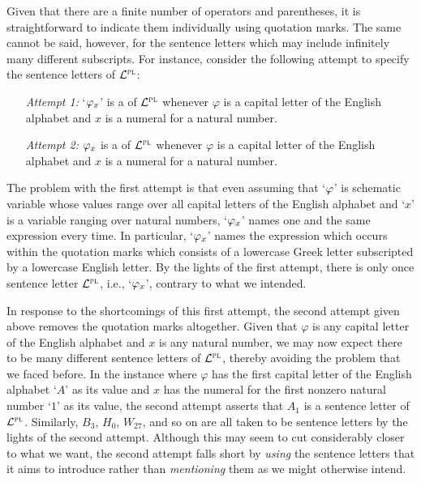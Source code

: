 Given that there are a finite number of operators and parentheses, it is straightforward to indicate them individually using quotation marks.
The same cannot be said, however, for the sentence letters which may include infinitely many different subscripts.
For instance, consider the following attempt to specify the sentence letters of $\mathcal{L}^{\textsc{pl}}$:

\begin{enumerate}[leftmargin=1.25in, itemsep=-.4em]
  \item[\it Attempt 1:] `$\varphi_x$' is a  of $\mathcal{L}^{\textsc{pl}}$ whenever $\varphi$ is a capital letter of the English alphabet and $x$ is a numeral for a natural number. 
  \item[\it Attempt 2:] $\varphi_x$ is a  of $\mathcal{L}^{\textsc{pl}}$ whenever $\varphi$ is a capital letter of the English alphabet and $x$ is a numeral for a natural number. 
\end{enumerate}

The problem with the first attempt is that even assuming that `$\varphi$' is schematic variable whose values range over all capital letters of the English alphabet and `$x$' is a variable ranging over natural numbers, `$\varphi_x$' names one and the same expression every time.
In particular, `$\varphi_x$' names the expression which occurs within the quotation marks which consists of a lowercase Greek letter subscripted by a lowercase English letter.
By the lights of the first attempt, there is only once sentence letter $\mathcal{L}^{\textsc{pl}}$, i.e., `$\varphi_x$', contrary to what we intended.

In response to the shortcomings of this first attempt, the second attempt given above removes the quotation marks altogether.
Given that $\varphi$ is any capital letter of the English alphabet and $x$ is any natural number, we may now expect there to be many different sentence letters of $\mathcal{L}^{\textsc{pl}}$, thereby avoiding the problem that we faced before.
In the instance where $\varphi$ has the first capital letter of the English alphabet `$A$' as its value and $x$ has the numeral for the first nonzero natural number `$1$' as its value, the second attempt asserts that $A_1$ is a sentence letter of $\mathcal{L}^{\textsc{pl}}$. 
Similarly, $B_3$, $H_0$, $W_{27}$, and so on are all taken to be sentence letters by the lights of the second attempt.
Although this may seem to cut considerably closer to what we want, the second attempt falls short by \textit{using} the sentence letters that it aims to introduce rather than \textit{mentioning} them as we might otherwise intend.

